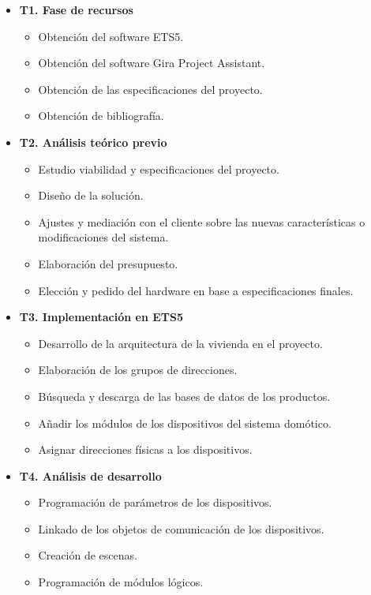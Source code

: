 \begin{itemize}
\item \textbf{T1. Fase de recursos}
	\begin{itemize}
	\item Obtención del software ETS5.
	\item Obtención del software Gira Project Assistant.
	\item Obtención de las especificaciones del proyecto.
	\item Obtención de bibliografía. \\
	\end{itemize} 
\item \textbf{T2. Análisis teórico previo}
	\begin{itemize}
	\item Estudio viabilidad y especificaciones del proyecto.
	\item Diseño de la solución.
	\item Ajustes y mediación con el cliente sobre las nuevas características o modificaciones del sistema.
	\item Elaboración del presupuesto.
	\item Elección y pedido del hardware en base a especificaciones finales. \\
	\end{itemize} 
\item \textbf{T3. Implementación en ETS5}
	\begin{itemize}
	\item Desarrollo de la arquitectura de la vivienda en el proyecto.
	\item Elaboración de los grupos de direcciones.
	\item Búsqueda y descarga de las bases de datos de los productos.
	\item Añadir los módulos de los dispositivos del sistema domótico.
	\item Asignar direcciones físicas a los dispositivos. \\
	\end{itemize} 
\item \textbf{T4. Análisis de desarrollo}
	\begin{itemize}
	\item Programación de parámetros de los dispositivos.
	\item Linkado de los objetos de comunicación de los dispositivos.
	\item Creación de escenas.
	\item Programación de módulos lógicos.

\end{itemize}
\end{itemize}
